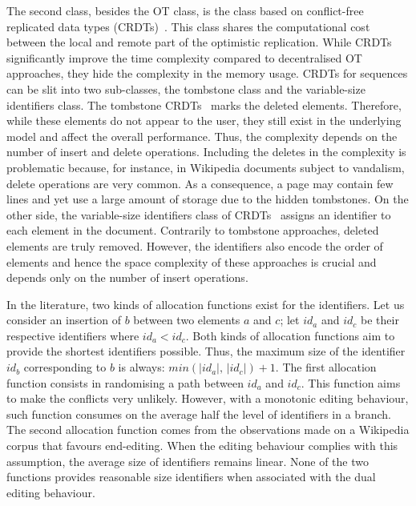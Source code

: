 The second class, besides the OT class, is the class based on conflict-free
replicated data types
(CRDTs)~\cite{shapiro2011comprehensive,shapiro2011conflict}. This class shares
the computational cost between the local and remote part of the optimistic
replication. While CRDTs significantly improve the time complexity compared to
decentralised OT approaches, they hide the complexity in the memory
usage. CRDTs for sequences can be slit into two sub-classes, the tombstone
class and the variable-size identifiers class. The tombstone 
CRDTs~\cite{ahmed2011evaluating,
  conway2014language,grishchenko2010deep,oster2006data,preguica2009commutative,
  roh2011replicated, weiss2007wooki,wu2010partial,Yu2012stringwise} marks the
deleted elements. Therefore, while these elements do not appear to the user,
they still exist in the underlying model and affect the overall
performance. Thus, the complexity depends on the number of insert and delete
operations. Including the deletes in the complexity is problematic because, for
instance, in Wikipedia documents subject to vandalism, delete operations are
very common. As a consequence, a page may contain few lines and yet use a large
amount of storage due to the hidden tombstones. On the other side, the
variable-size identifiers class of CRDTs~\cite{preguica2009commutative,
  andre2013supporting,weiss2009logoot} assigns an identifier to each element in
the document. Contrarily to tombstone approaches, deleted elements are truly
removed. However, the identifiers also encode the order of elements and hence
the space complexity of these approaches is crucial and depends only on the
number of insert operations.

In the literature, two kinds of allocation functions exist for the
identifiers. Let us consider an insertion of $b$ between two elements $a$ and
$c$; let $id_a$ and $id_c$ be their respective identifiers where
$id_a<id_c$. Both kinds of allocation functions aim to provide the shortest
identifiers possible. Thus, the maximum size of the identifier $id_b$
corresponding to $b$ is always: $min(|id_a|,\,|id_c|)+1$. The first allocation
function consists in randomising a path between $id_a$ and $id_c$. This
function aims to make the conflicts very unlikely. However, with a monotonic
editing behaviour, such function consumes on the average half the level of
identifiers in a branch. The second allocation function comes from the
observations made on a Wikipedia corpus that favours end-editing. When the
editing behaviour complies with this assumption, the average size of
identifiers remains linear. None of the two functions provides reasonable size
identifiers when associated with the dual editing behaviour.

